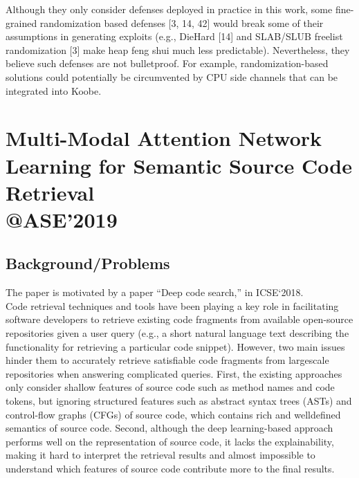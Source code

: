Although they only consider defenses deployed in practice in this work, some fine-grained randomization based defenses [3, 14, 42] would break some of their assumptions in generating exploits (e.g., DieHard [14] and SLAB/SLUB freelist randomization [3] make heap feng shui much less predictable). Nevertheless, they believe such defenses are not bulletproof. For example, randomization-based solutions could potentially be circumvented by CPU side channels that can be integrated into Koobe.  
\newpage

\section{Multi-Modal Attention Network Learning for Semantic Source Code Retrieval \\@ASE'2019}
\subsection{Background/Problems}
The paper is motivated by a paper  “Deep code search,” in ICSE‘2018. \\
Code retrieval techniques and tools have been playing a key role in facilitating software developers to retrieve existing code fragments from available open-source repositories given a user query (e.g., a short natural language text describing the functionality for retrieving a particular code snippet). However, two main issues hinder them to accurately retrieve satisfiable code fragments from largescale repositories when answering complicated queries. First, the existing approaches only consider shallow features of source code such as method names and code tokens, but ignoring structured features such as abstract syntax trees (ASTs) and control-flow graphs (CFGs) of source code, which contains rich and welldefined semantics of source code. Second, although the deep learning-based approach performs well on the representation of source code, it lacks the explainability, making it hard to interpret the retrieval results and almost impossible to understand which features of source code contribute more to the final results.
